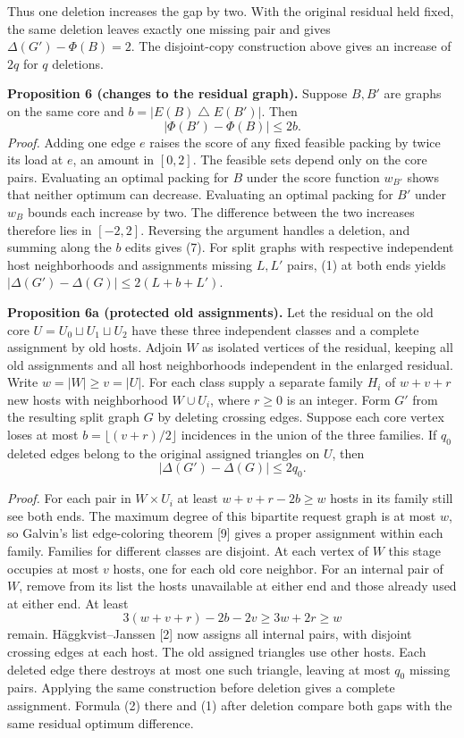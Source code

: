 \documentclass[english,11pt,a4paper]{article}
\begin{document}
Thus one deletion increases the gap by two. With the original residual held fixed, the same deletion leaves exactly one missing pair and gives \(\Delta(G')-\Phi(B)=2\). The disjoint-copy construction above gives an increase of \(2q\) for \(q\) deletions.

\textbf{Proposition 6 (changes to the residual graph).} Suppose \(B,B'\) are graphs on the same core and \(b=|E(B)\mathbin{\triangle} E(B')|\). Then \[
|\Phi(B')-\Phi(B)|\le 2b. \tag{7}
\] \emph{Proof.} Adding one edge \(e\) raises the score of any fixed feasible packing by twice its load at \(e\), an amount in \([0,2]\). The feasible sets depend only on the core pairs. Evaluating an optimal packing for \(B\) under the score function \(w_{B'}\) shows that neither optimum can decrease. Evaluating an optimal packing for \(B'\) under \(w_B\) bounds each increase by two. The difference between the two increases therefore lies in \([-2,2]\). Reversing the argument handles a deletion, and summing along the \(b\) edits gives (7). For split graphs with respective independent host neighborhoods and assignments missing \(L,L'\) pairs, (1) at both ends yields \(|\Delta(G')-\Delta(G)|\le 2(L+b+L')\).

\textbf{Proposition 6a (protected old assignments).} Let the residual on the old core \(U=U_0\sqcup U_1\sqcup U_2\) have these three independent classes and a complete assignment by old hosts. Adjoin \(W\) as isolated vertices of the residual, keeping all old assignments and all host neighborhoods independent in the enlarged residual. Write \(w=|W|\ge v=|U|\). For each class supply a separate family \(H_i\) of \(w+v+r\) new hosts with neighborhood \(W\cup U_i\), where \(r\ge0\) is an integer. Form \(G'\) from the resulting split graph \(G\) by deleting crossing edges. Suppose each core vertex loses at most \(b=\lfloor(v+r)/2\rfloor\) incidences in the union of the three families. If \(q_0\) deleted edges belong to the original assigned triangles on \(U\), then \[
|\Delta(G')-\Delta(G)|\le 2q_0.
\]

\emph{Proof.} For each pair in \(W\times U_i\) at least \(w+v+r-2b\ge w\) hosts in its family still see both ends. The maximum degree of this bipartite request graph is at most \(w\), so Galvin's list edge-coloring theorem {[}9{]} gives a proper assignment within each family. Families for different classes are disjoint. At each vertex of \(W\) this stage occupies at most \(v\) hosts, one for each old core neighbor. For an internal pair of \(W\), remove from its list the hosts unavailable at either end and those already used at either end. At least \[
3(w+v+r)-2b-2v\ge 3w+2r\ge w
\] remain. Häggkvist--Janssen {[}2{]} now assigns all internal pairs, with disjoint crossing edges at each host. The old assigned triangles use other hosts. Each deleted edge there destroys at most one such triangle, leaving at most \(q_0\) missing pairs. Applying the same construction before deletion gives a complete assignment. Formula (2) there and (1) after deletion compare both gaps with the same residual optimum difference.
\end{document}
